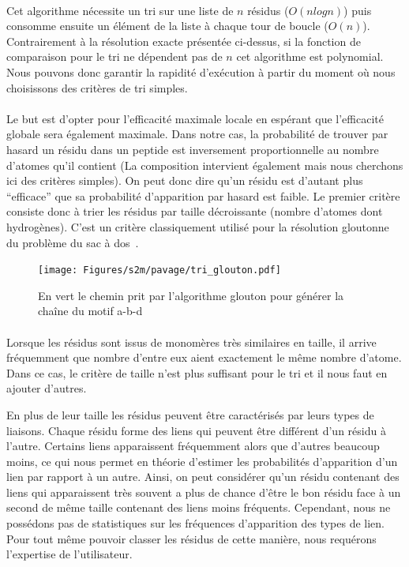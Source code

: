 \documentclass[12pt,french,twoside]{report}
\begin{document}
\paragraph{}Cet algorithme nécessite un tri sur une liste de $n$ résidus ($O(n log n)$) puis consomme ensuite un élément de la
liste à chaque tour de boucle ($O(n)$). Contrairement à la résolution exacte présentée ci-dessus, si la fonction de comparaison
pour le tri ne dépendent pas de $n$ cet algorithme est polynomial.
Nous pouvons donc garantir la rapidité d'exécution à partir du moment où nous choisissons des critères de tri simples.

\paragraph{}Le but est d'opter pour l'efficacité maximale locale en espérant que l'efficacité globale sera également maximale.
Dans notre cas, la probabilité de trouver par hasard un résidu dans un peptide est
inversement proportionnelle au nombre d'atomes qu'il contient (La composition intervient également mais nous cherchons ici des
critères simples). On peut donc dire qu'un résidu est d'autant plus ``efficace'' que sa probabilité d'apparition par hasard est
faible. Le premier critère consiste donc à trier les résidus par taille décroissante (nombre d'atomes dont hydrogènes).
C'est un critère classiquement utilisé pour la résolution gloutonne du problème du sac à dos~\cite{_probleme_2016}.

\begin{figure}
  \texttt{[image: Figures/s2m/pavage/tri\_glouton.pdf]}
  \caption{\label{tri_glouton}En vert le chemin prit par l'algorithme glouton pour générer la chaîne du motif a-b-d}
\end{figure}

\paragraph{}Lorsque les résidus sont issus de monomères très similaires en taille, il arrive fréquemment que nombre d'entre eux
aient exactement le même nombre d'atome.
Dans ce cas, le critère de taille n'est plus suffisant pour le tri et il nous faut en ajouter d'autres.

En plus de leur taille les résidus peuvent être caractérisés par leurs types de liaisons.
Chaque résidu forme des liens qui peuvent être différent d'un résidu à l'autre.
Certains liens apparaissent fréquemment alors que d'autres beaucoup moins, ce qui nous permet en théorie d'estimer les
probabilités d'apparition d'un lien par rapport à un autre.
Ainsi, on peut considérer qu'un résidu contenant des liens qui apparaissent très souvent a plus de chance d'être le bon résidu
face à un second de même taille contenant des liens moins fréquents.
Cependant, nous ne possédons pas de statistiques sur les fréquences d'apparition des types de lien.
Pour tout même pouvoir classer les résidus de cette manière, nous requérons l'expertise de l'utilisateur.
\end{document}

